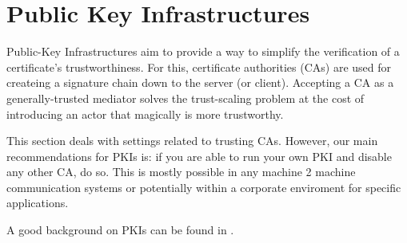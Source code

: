 \section{Public Key Infrastructures}

Public-Key Infrastructures aim to provide a way to simplify the verification of
a certificate's trustworthiness.  For this, certificate authorities (CAs) are
used for createing a signature chain down to the server (or client).  Accepting
a CA as a generally-trusted mediator solves the trust-scaling problem at the
cost of introducing an actor that magically is more trustworthy.

This section deals with settings related to trusting CAs.  However, our main
recommendations for PKIs is: if you are able to run your own PKI and disable
any other CA, do so.  This is mostly possible in any machine 2 machine
communication systems or potentially within a corporate enviroment for specific
applications.

A good background on PKIs can be found in .




